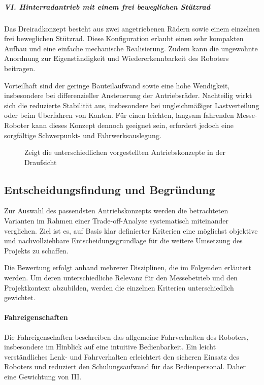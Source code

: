 \subparagraph{VI. Hinterradantrieb mit einem frei beweglichen Stützrad}
Das Dreiradkonzept besteht aus zwei angetriebenen Rädern sowie einem einzelnen frei beweglichen Stützrad. Diese Konfiguration erlaubt einen sehr kompakten Aufbau und eine einfache mechanische Realisierung. Zudem kann die ungewohnte Anordnung zur Eigenständigkeit und Wiedererkennbarkeit des Roboters beitragen.

Vorteilhaft sind der geringe Bauteilaufwand sowie eine hohe Wendigkeit, insbesondere bei differenzieller Ansteuerung der Antriebsräder. Nachteilig wirkt sich die reduzierte Stabilität aus, insbesondere bei ungleichmäßiger Lastverteilung oder beim Überfahren von Kanten. Für einen leichten, langsam fahrenden Messe-Roboter kann dieses Konzept dennoch geeignet sein, erfordert jedoch eine sorgfältige Schwerpunkt- und Fahrwerksauslegung.


\begin{figure}[hbt]
	\centering
	
	\vspace{0.6cm}
	\caption{Zeigt die unterschiedlichen vorgestellten Antriebskonzepte in der Draufsicht}		
	\label{fig:Antribskonzepte_Ketten_Räder}
\end{figure}


\subsection{Entscheidungsfindung und Begründung}
\label{cha:Entscheidungsfindung und Begründung}

Zur Auswahl des passendsten Antriebskonzepts werden die betrachteten Varianten im Rahmen einer Trade-off-Analyse systematisch miteinander verglichen. Ziel ist es, auf Basis klar definierter Kriterien eine möglichst objektive und nachvollziehbare Entscheidungsgrundlage für die weitere Umsetzung des Projekts zu schaffen.

Die Bewertung erfolgt anhand mehrerer Disziplinen, die im Folgenden erläutert werden. Um deren unterschiedliche Relevanz für den Messebetrieb und den Projektkontext abzubilden, werden die einzelnen Kriterien unterschiedlich gewichtet.

\paragraph{Fahreigenschaften}
Die Fahreigenschaften beschreiben das allgemeine Fahrverhalten des Roboters, insbesondere im Hinblick auf eine intuitive Bedienbarkeit. Ein leicht verständliches Lenk- und Fahrverhalten erleichtert den sicheren Einsatz des Roboters und reduziert den Schulungsaufwand für das Bedienpersonal. Daher eine Gewichtung von III.

